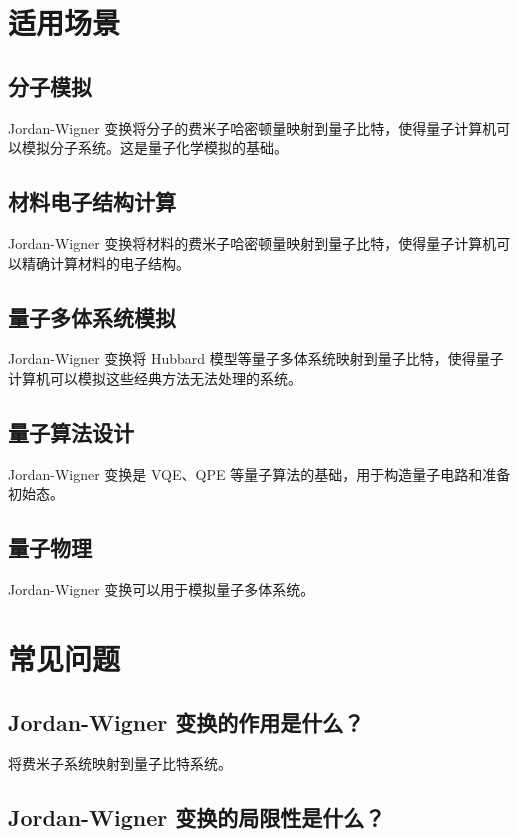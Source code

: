 \documentclass[12pt,a4paper]{article}
\begin{document}
\section{适用场景}

\subsection{分子模拟}

Jordan-Wigner 变换将分子的费米子哈密顿量映射到量子比特，使得量子计算机可以模拟分子系统。这是量子化学模拟的基础。

\subsection{材料电子结构计算}

Jordan-Wigner 变换将材料的费米子哈密顿量映射到量子比特，使得量子计算机可以精确计算材料的电子结构。

\subsection{量子多体系统模拟}

Jordan-Wigner 变换将 Hubbard 模型等量子多体系统映射到量子比特，使得量子计算机可以模拟这些经典方法无法处理的系统。

\subsection{量子算法设计}

Jordan-Wigner 变换是 VQE、QPE 等量子算法的基础，用于构造量子电路和准备初始态。

\subsection{量子物理}

Jordan-Wigner 变换可以用于模拟量子多体系统。

\section{常见问题}

\subsection{Jordan-Wigner 变换的作用是什么？}

将费米子系统映射到量子比特系统。

\subsection{Jordan-Wigner 变换的局限性是什么？}
\end{document}
